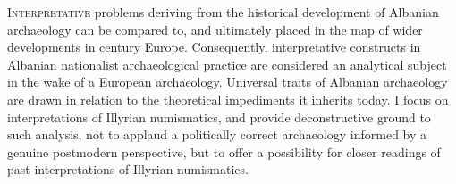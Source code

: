 	
\lettrine[nindent=0em,lines=3]{I}{nterpretative}  problems deriving from the historical development of Albanian archaeology can be compared to, and ultimately placed in the map of wider developments in  century Europe. Consequently, interpretative constructs in Albanian nationalist archaeological practice are considered an analytical subject in the wake of a European archaeology. Universal traits of Albanian archaeology are drawn in relation to the theoretical impediments it inherits today. I focus on interpretations of Illyrian numismatics, and provide deconstructive ground to such analysis, not to applaud a politically correct archaeology informed by a genuine postmodern perspective, but to offer a possibility for closer readings of past interpretations of Illyrian numismatics. 
	
		
	
